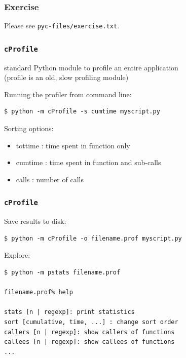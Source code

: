 \documentclass[serif]{beamer}
\begin{document}
\begin{frame}
  \frametitle{Exercise}

  Please see \texttt{pyc-files/exercise.txt}.

\end{frame}


\begin{frame}[fragile]
  \frametitle{\texttt{cProfile}}

  standard Python module to profile an entire application\\
  (profile is an old, slow profiling module)

  \bigskip

  Running the profiler from command line:
  \begin{verbatim}
$ python -m cProfile -s cumtime myscript.py
  \end{verbatim}

  \bigskip

  Sorting options:
  \begin{itemize}
    \item
      tottime : time spent in function only
    \item
      cumtime : time spent in function and sub-calls
    \item
      calls   : number of calls
  \end{itemize}
\end{frame}

\begin{frame}[fragile]
  \frametitle{\texttt{cProfile}}

  Save results to disk:
  \begin{verbatim}
$ python -m cProfile -o filename.prof myscript.py
  \end{verbatim}
  
  Explore:
  \begin{verbatim}
$ python -m pstats filename.prof

filename.prof% help

stats [n | regexp]: print statistics
sort [cumulative, time, ...] : change sort order
callers [n | regexp]: show callers of functions
callees [n | regexp]: show callees of functions
...
  \end{verbatim}
\end{frame}
\end{document}
